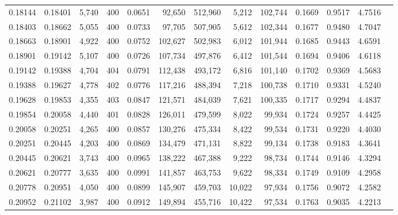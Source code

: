 \begin{tabular}{rrrrrrrrrrrrr}
0.18144 & 0.18401 &  5,740 & 400 &                                     0.0651 &  92,650 & 512,960 &   5,212 & 102,744 & 0.1669 & 0.9517 & 4.7516 \\
0.18403 & 0.18662 &  5,055 & 400 &                                     0.0733 &  97,705 & 507,905 &   5,612 & 102,344 & 0.1677 & 0.9480 & 4.7047 \\
0.18663 & 0.18901 &  4,922 & 400 &                                     0.0752 & 102,627 & 502,983 &   6,012 & 101,944 & 0.1685 & 0.9443 & 4.6591 \\
0.18901 & 0.19142 &  5,107 & 400 &                                     0.0726 & 107,734 & 497,876 &   6,412 & 101,544 & 0.1694 & 0.9406 & 4.6118 \\
0.19142 & 0.19388 &  4,704 & 404 &                                     0.0791 & 112,438 & 493,172 &   6,816 & 101,140 & 0.1702 & 0.9369 & 4.5683 \\
0.19388 & 0.19627 &  4,778 & 402 &                                     0.0776 & 117,216 & 488,394 &   7,218 & 100,738 & 0.1710 & 0.9331 & 4.5240 \\
0.19628 & 0.19853 &  4,355 & 403 &                                     0.0847 & 121,571 & 484,039 &   7,621 & 100,335 & 0.1717 & 0.9294 & 4.4837 \\
0.19854 & 0.20058 &  4,440 & 401 &                                     0.0828 & 126,011 & 479,599 &   8,022 &  99,934 & 0.1724 & 0.9257 & 4.4425 \\
0.20058 & 0.20251 &  4,265 & 400 &                                     0.0857 & 130,276 & 475,334 &   8,422 &  99,534 & 0.1731 & 0.9220 & 4.4030 \\
0.20251 & 0.20445 &  4,203 & 400 &                                     0.0869 & 134,479 & 471,131 &   8,822 &  99,134 & 0.1738 & 0.9183 & 4.3641 \\
0.20445 & 0.20621 &  3,743 & 400 &                                     0.0965 & 138,222 & 467,388 &   9,222 &  98,734 & 0.1744 & 0.9146 & 4.3294 \\
0.20621 & 0.20777 &  3,635 & 400 &                                     0.0991 & 141,857 & 463,753 &   9,622 &  98,334 & 0.1749 & 0.9109 & 4.2958 \\
0.20778 & 0.20951 &  4,050 & 400 &                                     0.0899 & 145,907 & 459,703 &  10,022 &  97,934 & 0.1756 & 0.9072 & 4.2582 \\
0.20952 & 0.21102 &  3,987 & 400 &                                     0.0912 & 149,894 & 455,716 &  10,422 &  97,534 & 0.1763 & 0.9035 & 4.2213 \\

\end{tabular}
